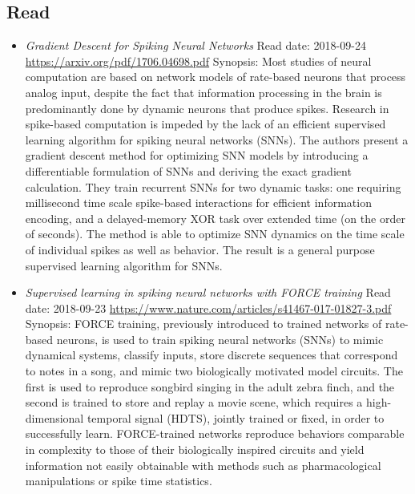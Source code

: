 \documentclass{article}%
\begin{document}
\subsection{Read}%
\label{subsec:Read}%
\begin{itemize}%
\item%
\textit{Gradient Descent for Spiking Neural Networks}%
\newline%
Read date: 2018{-}09{-}24%
\newline%
\href{https://arxiv.org/pdf/1706.04698.pdf}{https://arxiv.org/pdf/1706.04698.pdf}%
\newline%
Synopsis: Most studies of neural computation are based on network models of rate{-}based neurons that process analog input, despite the fact that information processing in the brain is predominantly done by dynamic neurons that produce spikes. Research in spike{-}based computation is impeded by the lack of an efficient supervised learning algorithm for spiking neural networks (SNNs). The authors present a gradient descent method for optimizing SNN models by introducing a differentiable formulation of SNNs and deriving the exact gradient calculation. They train recurrent SNNs for two dynamic tasks: one requiring millisecond time scale spike{-}based interactions for efficient information encoding, and a delayed{-}memory XOR task over extended time (on the order of seconds). The method is able to optimize SNN dynamics on the time scale of individual spikes as well as behavior. The result is a general purpose supervised learning algorithm for SNNs.%
\item%
\textit{Supervised learning in spiking neural networks with FORCE training}%
\newline%
Read date: 2018{-}09{-}23%
\newline%
\href{https://www.nature.com/articles/s41467{-}017{-}01827{-}3.pdf}{https://www.nature.com/articles/s41467{-}017{-}01827{-}3.pdf}%
\newline%
Synopsis: FORCE training, previously introduced to trained networks of rate{-}based neurons, is used to train spiking neural networks (SNNs) to mimic dynamical systems, classify inputs, store discrete sequences that correspond to notes in a song, and mimic two biologically motivated model circuits. The first is used to reproduce songbird singing in the adult zebra finch, and the second is trained to store and replay a movie scene, which requires a high{-}dimensional temporal signal (HDTS), jointly trained or fixed, in order to successfully learn. FORCE{-}trained networks reproduce behaviors comparable in complexity to those of their biologically inspired circuits and yield information not easily obtainable with methods such as pharmacological manipulations or spike time statistics.%

\end{itemize}
\end{document}

